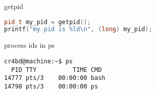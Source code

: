 \begin{frame}[fragile,label=getpid]{getpid}
\begin{lstlisting}[language=C++]
pid_t my_pid = getpid();
printf("my pid is %ld\n", (long) my_pid);
\end{lstlisting}
\end{frame}

\begin{frame}[fragile,label=ps]{process ids in ps}
\begin{Verbatim}
cr4bd@machine:~$ ps
  PID TTY          TIME CMD
14777 pts/3    00:00:00 bash
14798 pts/3    00:00:00 ps
\end{Verbatim}
\end{frame}
